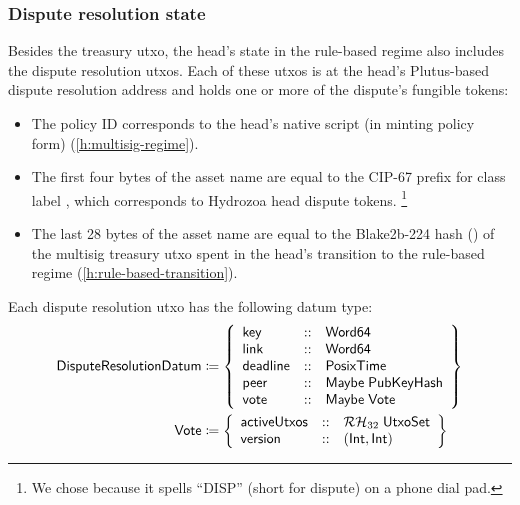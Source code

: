 \documentclass[../hydrozoa.tex]{subfiles}
\begin{document}
\subsubsection{Dispute resolution state}%
\label{h:rule-based-dispute-resolution-state}
Besides the treasury utxo, the head's state in the rule-based regime also includes the dispute resolution utxos.
Each of these utxos is at the head's Plutus-based dispute resolution address and holds one or more of the dispute's fungible tokens:
\begin{itemize}
  \item The policy ID corresponds to the head's native script (in minting policy form) (\cref{h:multisig-regime}).
  \item The first four bytes of the asset name are equal to the CIP-67
    \citep{AlessandroKonradThomasVellekoopCIP67AssetName2022}
    prefix for class label \inlineColored{\disputeTokenNum}, which corresponds to Hydrozoa head dispute tokens.%
    \footnote{We chose \inlineColored{\disputeTokenNum} because it spells ``DISP'' (short for dispute) on a phone dial pad.}
  \item The last 28 bytes of the asset name are equal to the Blake2b-224 hash () of the multisig treasury utxo spent in the head's transition to the rule-based regime (\cref{h:rule-based-transition}).
\end{itemize}

Each dispute resolution utxo has the following datum type:
\begin{equation*}
\begin{split}
  \mathsf{DisputeResolutionDatum} &\coloneq \left\{
    \begin{array}{lll}
      \mathsf{key}  &::& \mathsf{Word64} \\
      \mathsf{link} &::& \mathsf{Word64} \\
      \mathsf{deadline} &::& \mathsf{PosixTime} \\
      \mathsf{peer} &::& \mathsf{Maybe} \; \mathsf{PubKeyHash} \\
      \mathsf{vote} &::& \mathsf{Maybe} \; \mathsf{Vote}
    \end{array}\right\}\\
  \mathsf{Vote} &\coloneq \left\{
    \begin{array}{lll}
      \mathsf{activeUtxos} &::& \mathcal{RH}_{32} \; \mathsf{UtxoSet} \\
      \mathsf{version} &::& (\mathsf{Int}, \mathsf{Int})
    \end{array}\right\}
\end{split}
\end{equation*}
\end{document}
